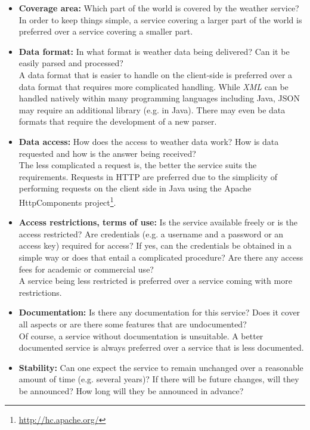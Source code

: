 \begin{itemize}
  \item \textbf{Coverage area:} Which part of the world is covered by the weather service?\\
  In order to keep things simple, a service covering a larger part of the world is preferred over a service covering a smaller part.
  \item \textbf{Data format:} In what format is weather data being delivered? Can it be easily parsed and processed?\\
  A data format that is easier to handle on the client-side is preferred over a data format that requires more complicated handling. While \emph{XML}\cite{XML} can be handled natively within many programming languages including Java, JSON may require an additional library (e.g. in Java). There may even be data formats that require the development of a new parser.%
  \item \textbf{Data access:} How does the access to weather data work? How is data requested and how is the answer being received?\\
  The less complicated a request is, the better the service suits the requirements. Requests in HTTP are preferred due to the simplicity of performing requests on the client side in Java using the Apache HttpComponents project\footnote{\href{http://hc.apache.org/}{http://hc.apache.org/}}.
  \item \textbf{Access restrictions, terms of use:} Is the service available freely or is the access restricted? Are credentials (e.g. a username and a password or an access key) required for access? If yes, can the credentials be obtained in a simple way or does that entail a complicated procedure? Are there any access fees for academic or commercial use?\\
  A service being less restricted is preferred over a service coming with more restrictions.
  \item \textbf{Documentation:} Is there any documentation for this service? Does it cover all aspects or are there some features that are undocumented?\\
  Of course, a service without documentation is unsuitable. A better documented service is always preferred over a service that is less documented.
  \item \textbf{Stability:} Can one expect the service to remain unchanged over a reasonable amount of time (e.g. several years)? If there will be future changes, will they be announced? How long will they be announced in advance?\\

\end{itemize}
